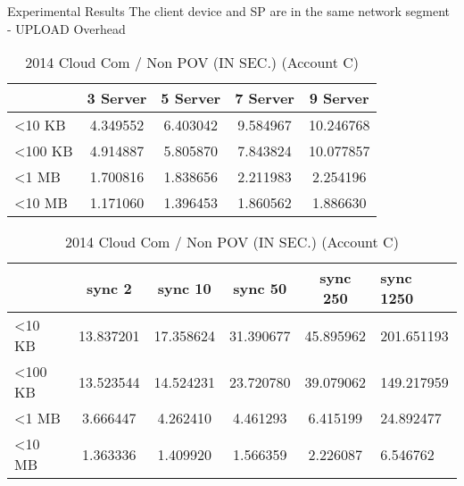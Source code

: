 \begin{frame}{Experimental Results}
{The client device and SP are in the same network segment - UPLOAD Overhead}
	\scriptsize
    \begin{table}[]
    \centering
    \caption{My Method / Non POV (IN SEC.) (Account C)}
    \begin{tabular}{lcccc}
                         & 3 Server & 5 Server & 7 Server & 9 Server  \\ \hline
        \textless 10 KB  & 4.349552 & 6.403042 & 9.584967 & 10.246768 \\ \hline
        \textless 100 KB & 4.914887 & 5.805870 & 7.843824 & 10.077857 \\ \hline
        \textless 1 MB   & 1.700816 & 1.838656 & 2.211983 & 2.254196  \\ \hline
        \textless 10 MB  & 1.171060 & 1.396453 & 1.860562 & 1.886630  \\ \hline
    \end{tabular}
    \caption{2014 Cloud Com / Non POV (IN SEC.) (Account C)}
    \begin{tabular}{lccccl}
                         & sync 2    & sync 10   & sync 50   & sync 250  & sync 1250  \\ \hline
        \textless 10 KB  & 13.837201 & 17.358624 & 31.390677 & 45.895962 & 201.651193 \\ \hline
        \textless 100 KB & 13.523544 & 14.524231 & 23.720780 & 39.079062 & 149.217959 \\ \hline
        \textless 1 MB   & 3.666447  & 4.262410  & 4.461293  & 6.415199  & 24.892477  \\ \hline
        \textless 10 MB  & 1.363336  & 1.409920  & 1.566359  & 2.226087  & 6.546762   \\ \hline
    \end{tabular}
    \end{table}
\end{frame}

